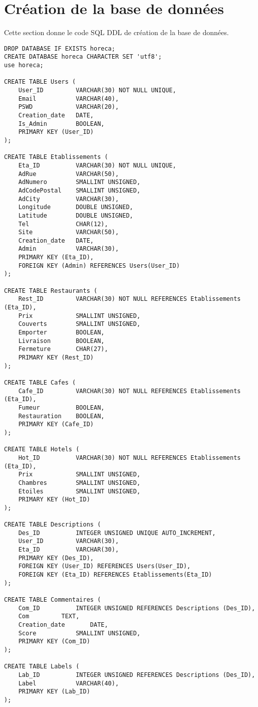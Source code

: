 \section{Création de la base de données}
\noindent Cette section donne le code SQL DDL de création de la base de données.\\
\begin{verbatim}
DROP DATABASE IF EXISTS horeca;
CREATE DATABASE horeca CHARACTER SET 'utf8';
use horeca;

CREATE TABLE Users (
	User_ID			VARCHAR(30) NOT NULL UNIQUE,
	Email			VARCHAR(40),
	PSWD			VARCHAR(20),
	Creation_date	DATE,
	Is_Admin		BOOLEAN,
	PRIMARY KEY (User_ID)
);

CREATE TABLE Etablissements (
	Eta_ID			VARCHAR(30) NOT NULL UNIQUE,
	AdRue			VARCHAR(50),
	AdNumero		SMALLINT UNSIGNED,
	AdCodePostal	SMALLINT UNSIGNED,
	AdCity			VARCHAR(30),
	Longitude		DOUBLE UNSIGNED,
	Latitude		DOUBLE UNSIGNED,
	Tel				CHAR(12),
	Site			VARCHAR(50),
	Creation_date	DATE,
	Admin			VARCHAR(30),
	PRIMARY KEY (Eta_ID),
	FOREIGN KEY (Admin) REFERENCES Users(User_ID)
);

CREATE TABLE Restaurants (
	Rest_ID			VARCHAR(30) NOT NULL REFERENCES Etablissements (Eta_ID),
	Prix			SMALLINT UNSIGNED,
	Couverts		SMALLINT UNSIGNED,
	Emporter		BOOLEAN,
	Livraison		BOOLEAN,
	Fermeture		CHAR(27),
	PRIMARY KEY (Rest_ID)
);

CREATE TABLE Cafes (
	Cafe_ID			VARCHAR(30) NOT NULL REFERENCES Etablissements (Eta_ID),
	Fumeur			BOOLEAN,
	Restauration	BOOLEAN,
	PRIMARY KEY (Cafe_ID)
);

CREATE TABLE Hotels (
	Hot_ID			VARCHAR(30) NOT NULL REFERENCES Etablissements (Eta_ID),
	Prix			SMALLINT UNSIGNED,
	Chambres		SMALLINT UNSIGNED,
	Etoiles			SMALLINT UNSIGNED,
	PRIMARY KEY (Hot_ID)
);

CREATE TABLE Descriptions (
	Des_ID			INTEGER UNSIGNED UNIQUE AUTO_INCREMENT,
	User_ID			VARCHAR(30),
	Eta_ID			VARCHAR(30),
	PRIMARY KEY (Des_ID),
	FOREIGN KEY (User_ID) REFERENCES Users(User_ID),
	FOREIGN KEY (Eta_ID) REFERENCES Etablissements(Eta_ID)
);

CREATE TABLE Commentaires (
	Com_ID			INTEGER UNSIGNED REFERENCES Descriptions (Des_ID),
	Com			TEXT,
	Creation_date		DATE,
	Score			SMALLINT UNSIGNED,
	PRIMARY KEY (Com_ID)
);

CREATE TABLE Labels (
	Lab_ID			INTEGER UNSIGNED REFERENCES Descriptions (Des_ID),
	Label			VARCHAR(40),
	PRIMARY KEY (Lab_ID)
);


\end{verbatim}
